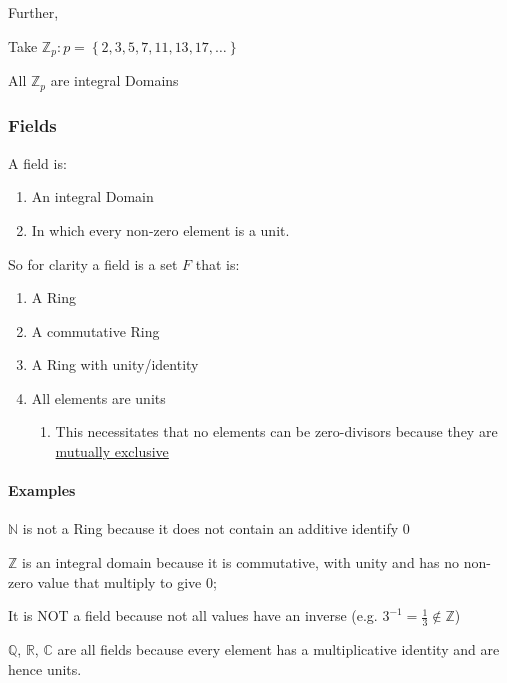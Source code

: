 \documentclass[
]{article}
\begin{document}
Further,

Take
\(\mathbb{Z}_p : p = \left \{ 2,3, 5, 7, 11, 13, 17, \dots \right \}\)

All \(\mathbb{Z}_p\) are integral Domains

\hypertarget{header-n887}{%
\subsubsection{Fields}\label{header-n887}}

A field is:

\begin{enumerate}
\def\labelenumi{\arabic{enumi}.}
\item
  An integral Domain
\item
  In which every non-zero element is a unit.
\end{enumerate}

So for clarity a field is a set \(F\) that is:

\begin{enumerate}
\def\labelenumi{\arabic{enumi}.}
\item
  A Ring
\item
  A commutative Ring
\item
  A Ring with unity/identity
\item
  All elements are units

  \begin{enumerate}
  \def\labelenumii{\arabic{enumii}.}
  \item
    This necessitates that no elements can be zero-divisors because they
    are \protect\hyperlink{notboth}{mutually exclusive}
  \end{enumerate}
\end{enumerate}

\hypertarget{header-n908}{%
\paragraph{Examples}\label{header-n908}}

\(\mathbb{N}\) is not a Ring because it does not contain an additive
identify \(0\)

\(\mathbb{Z}\) is an integral domain because it is commutative, with
unity and has no non-zero value that multiply to give 0;

It is NOT a field because not all values have an inverse (e.g.
\(3^{-1} = \frac{1}{3} \notin \mathbb{Z}\))

\(\mathbb{Q}\), \(\mathbb{R}\), \(\mathbb{C}\) are all fields because
every element has a multiplicative identity and are hence units.
\end{document}
